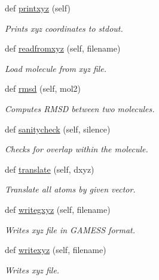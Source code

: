 \begin{DoxyCompactItemize}
def \hyperlink{classmolSimplify_1_1Classes_1_1mol3D_1_1mol3D_ae6f619f46f387b2b609807fe06a6876a}{printxyz} (self)
\begin{DoxyCompactList}\small\item\em Prints xyz coordinates to stdout. \end{DoxyCompactList}\item 
def \hyperlink{classmolSimplify_1_1Classes_1_1mol3D_1_1mol3D_a693d0fb9d44650a500c91cac47e93a80}{readfromxyz} (self, filename)
\begin{DoxyCompactList}\small\item\em Load molecule from xyz file. \end{DoxyCompactList}\item 
def \hyperlink{classmolSimplify_1_1Classes_1_1mol3D_1_1mol3D_a970c3cdf7b4a051715a89e284d4227e6}{rmsd} (self, mol2)
\begin{DoxyCompactList}\small\item\em Computes R\+M\+SD between two molecules. \end{DoxyCompactList}\item 
def \hyperlink{classmolSimplify_1_1Classes_1_1mol3D_1_1mol3D_af79c7b686fca67c122bb1e0507f845a6}{sanitycheck} (self, silence)
\begin{DoxyCompactList}\small\item\em Checks for overlap within the molecule. \end{DoxyCompactList}\item 
def \hyperlink{classmolSimplify_1_1Classes_1_1mol3D_1_1mol3D_a27bd691cb90ab44c3acc746dc637baed}{translate} (self, dxyz)
\begin{DoxyCompactList}\small\item\em Translate all atoms by given vector. \end{DoxyCompactList}\item 
def \hyperlink{classmolSimplify_1_1Classes_1_1mol3D_1_1mol3D_a773c0ca887457100e8034a8eacc28103}{writegxyz} (self, filename)
\begin{DoxyCompactList}\small\item\em Writes xyz file in G\+A\+M\+E\+SS format. \end{DoxyCompactList}\item 
def \hyperlink{classmolSimplify_1_1Classes_1_1mol3D_1_1mol3D_a9d338e17fae1e6f4d7a9012a76844e7c}{writexyz} (self, filename)
\begin{DoxyCompactList}\small\item\em Writes xyz file. \end{DoxyCompactList}\item 

\end{DoxyCompactItemize}
